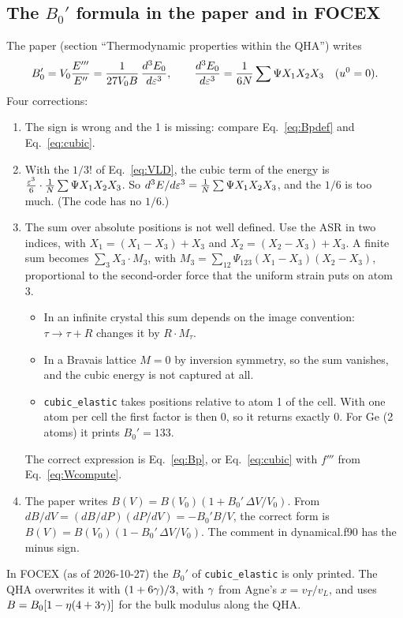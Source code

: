 \documentclass[11pt,a4paper]{article}
\begin{document}
\subsection{The \texorpdfstring{$B_0'$}{B0'} formula in the paper and in FOCEX}
The paper (section ``Thermodynamic properties within the QHA'') writes
\[
B_0'=V_0\frac{E'''}{E''}=\frac1{27V_0B}\,\frac{d^3E_0}{d\varepsilon^3},\qquad
\frac{d^3E_0}{d\varepsilon^3}=\frac1{6N}\sum\Psi X_1X_2X_3\quad(u^0=0).
\]
Four corrections:
\begin{enumerate}
\item The sign is wrong and the 1 is missing: compare Eq.~\eqref{eq:Bpdef} and Eq.~\eqref{eq:cubic}.
\item With the $1/3!$ of Eq.~\eqref{eq:VLD}, the cubic term of the energy is
  $\frac{\varepsilon^3}{6}\cdot\frac1N\sum\Psi X_1X_2X_3$. So $d^3E/d\varepsilon^3=\frac1N\sum\Psi X_1X_2X_3$, and the $1/6$ is too
  much. (The code has no $1/6$.)
\item The sum over absolute positions is not well defined. Use the ASR in two indices, with
  $X_1=(X_1-X_3)+X_3$ and $X_2=(X_2-X_3)+X_3$. A finite sum becomes $\sum_3X_3\cdot M_3$, with
  $M_3=\sum_{12}\Psi_{123}(X_1-X_3)(X_2-X_3)$, proportional to the second-order force that the uniform strain
  puts on atom 3.
  \begin{itemize}
  \item In an infinite crystal this sum depends on the image convention: $\tau\to\tau+R$ changes it by $R\cdot M_\tau$.
  \item In a Bravais lattice $M=0$ by inversion symmetry, so the sum vanishes, and the cubic energy is not captured at all.
  \item \texttt{cubic\_elastic} takes positions relative to atom 1 of the cell. With one atom per cell the
    first factor is then 0, so it returns exactly 0. For Ge (2 atoms) it prints $B_0'=133$.
  \end{itemize}
  The correct expression is Eq.~\eqref{eq:Bp}, or Eq.~\eqref{eq:cubic} with $f'''$ from Eq.~\eqref{eq:Wcompute}.
\item The paper writes $B(V)=B(V_0)(1+B_0'\,\Delta V/V_0)$. From $dB/dV=(dB/dP)(dP/dV)=-B_0'B/V$, the correct
  form is $B(V)=B(V_0)(1-B_0'\,\Delta V/V_0)$. The comment in dynamical.f90 has the minus sign.
\end{enumerate}
In FOCEX (as of 2026-10-27) the $B_0'$ of \texttt{cubic\_elastic} is only printed. The QHA overwrites it
with $(1+6\gamma)/3$, with $\gamma$ from Agne's $x=v_T/v_L$, and uses $B=B_0[1-\eta(4+3\gamma)]$ for the bulk modulus
along the QHA.
\end{document}
